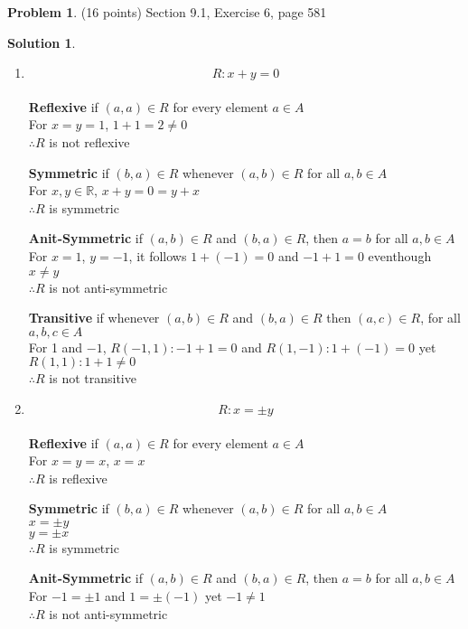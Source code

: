 \documentclass{article}
\theoremstyle{definition}
\newtheorem{problem}{Problem}
\newtheorem*{solution}{Solution}
\begin{document}
\begin{problem} (16 points)
Section 9.1, Exercise 6, page 581
\end{problem}
\begin{solution} \ \\
  \begin{enumerate}[label=(\alph*)]

    \item $$ R: x+y = 0$$ \\
  
      \textbf{Reflexive} if $(a,a) \in R$ for every element $a \in A$ \\
      For $x = y = 1$, $1 + 1 =2 \neq 0$ \\
      $\therefore R$ is not reflexive
    
      \textbf{Symmetric} if $(b,a) \in R$ whenever $(a,b) \in R$ for all $a,b \in A$ \\
      For $x,y \in \mathbb{R}$, $ x+ y = 0 = y + x$ \\
      $\therefore R$ is symmetric
    
      \textbf{Anit-Symmetric} if $(a,b) \in R$ and $(b,a) \in R$, then $a=b$ for all $a,b \in A$ \\
      For $x=1$, $y=-1$, it follows $1 + (-1) = 0$ and $-1 + 1 = 0$ eventhough $x \neq y$\\
      $\therefore R$ is not anti-symmetric 
    
      \textbf{Transitive} if whenever $(a,b) \in R$ and $(b,a) \in R$ then $(a,c) \in R$, for all $a,b,c \in A$ \\
      For 1 and $-1$, $R(-1,1): -1 + 1 = 0$ and $R(1,-1): 1 + (-1) = 0$ yet $R(1,1): 1 + 1 \neq 0$ \\
      $\therefore R$ is not transitive

    \item $$ R: x = \pm y $$ \\
  
      \textbf{Reflexive} if $(a,a) \in R$ for every element $a \in A$ \\
      For $x = y = x$, $x = x$ \\
      $\therefore R$ is reflexive
    
      \textbf{Symmetric} if $(b,a) \in R$ whenever $(a,b) \in R$ for all $a,b \in A$ \\
      $x = \pm y$ \\
      $y = \pm x$ \\
      $\therefore R$ is symmetric
    
      \textbf{Anit-Symmetric} if $(a,b) \in R$ and $(b,a) \in R$, then $a=b$ for all $a,b \in A$ \\
      For $-1 = \pm 1$ and $1 = \pm (-1)$ yet $-1 \neq 1$\\
      $\therefore R$ is not anti-symmetric 
    

\end{enumerate}
\end{solution}
\end{document}
